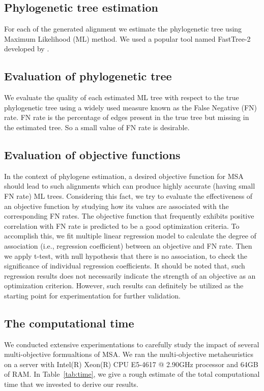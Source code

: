 \subsection{Phylogenetic tree estimation}
For each of the generated alignment we estimate the phylogenetic tree using Maximum Likelihood (ML) method. We used a popular tool named FastTree-2 developed by \citealp{price2010fasttree}. %

\subsection{Evaluation of phylogenetic tree}
We evaluate the quality of each estimated ML tree with respect to the true phylogenetic tree using a widely used measure known as the False Negative (FN) rate. FN rate is the percentage of edges present in the true tree but missing in the estimated tree. So a small value of FN rate is desirable. %

\subsection{Evaluation of objective functions}
In the context of phylogene estimation, a desired objective function for MSA should lead to such alignments which can produce highly accurate (having small FN rate) ML trees. Considering this fact, we try to evaluate the effectiveness of an objective function by studying how its values are associated with the corresponding FN rates. The objective function that frequently exhibits positive correlation with FN rate is predicted to be a good optimization criteria. To accomplish this, we fit multiple linear regression model to calculate the degree of association (i.e., regression coefficient) between an objective and FN rate. Then we apply t-test, with null hypothesis that there is no association, to check the significance of individual regression coefficients. It should be noted that, such regression results does not necessarily indicate the strength of an objective as an optimization criterion. However, such results can definitely be utilized as the starting point for experimentation for further validation.

\subsection{The computational time}
We conducted extensive experimentations to carefully study the impact of several multi-objective formualtions of MSA. We ran the multi-objective metaheuristics on a server with Intel(R) Xeon(R) CPU E5-4617 @ 2.90GHz processor and 64GB of RAM. In Table~\ref{tab:time}, we give a rough estimate of the total computational time that we invested to derive our results.

